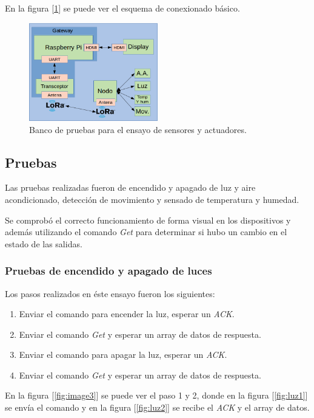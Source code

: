 En la figura [\ref{fig:bancodepruebas2}] se puede ver el esquema de conexionado básico.

\begin{figure}[h!]
	\centering
	\includegraphics[width=0.5\textwidth]{./Figures/bancodepruebas1.png}
	\caption{Banco de pruebas para el ensayo de sensores y actuadores.}
	\label{fig:bancodepruebas2}
\end{figure}

\subsection{Pruebas}

Las pruebas realizadas fueron de encendido y apagado de luz y aire acondicionado, detección de movimiento y sensado de temperatura y humedad.

Se comprobó el correcto funcionamiento de forma visual en los dispositivos y además utilizando el comando {\textit{Get}} para determinar si hubo un cambio en el estado de las salidas.

\subsubsection{Pruebas de encendido y apagado de luces}

Los pasos realizados en éste ensayo fueron los siguientes:

\begin{enumerate}
\item Enviar el comando para encender la luz, esperar un {\textit{ACK}}.
\item Enviar el comando {\textit{Get}} y esperar un array de datos de respuesta.
\item Enviar el comando para apagar la luz, esperar un {\textit{ACK}}.
\item Enviar el comando {\textit{Get}} y esperar un array de datos de respuesta.
\end{enumerate}

En la figura [\ref{fig:image3}] se puede ver el paso 1 y 2, donde en la figura [\ref{fig:luz1}] se envía el comando y en la figura [\ref{fig:luz2}] se recibe el {\textit{ACK}} y el array de datos.


